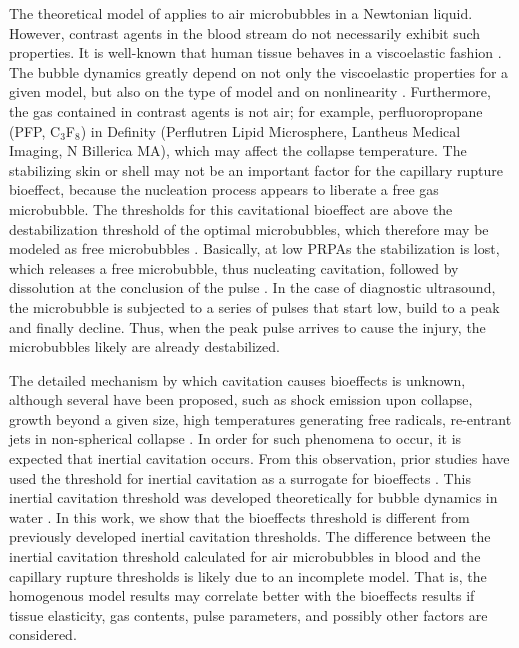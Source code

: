 The theoretical model of \cite{apfel1991} applies to air microbubbles
in a Newtonian liquid. However, contrast agents in the blood stream do
not necessarily exhibit such properties. It is well-known that human
tissue behaves in a viscoelastic fashion
\cite[]{frizzell1976,madsen1983}. The bubble dynamics greatly depend
on not only the viscoelastic properties \cite[]{allen2000a,Yang2005}
for a given model, but also on the type of model \cite[]{johnsen2012} and
on nonlinearity \cite[]{allen2000b}.  Furthermore, the gas contained
in contrast agents is not air; for example, perfluoropropane (PFP, C$_3$F$_8$) in
Definity (Perflutren Lipid Microsphere, Lantheus Medical Imaging, N
Billerica MA), which may affect the collapse temperature.  The
stabilizing skin or shell may not be an important factor for the
capillary rupture bioeffect, because the nucleation process appears to
liberate a free gas microbubble. The thresholds for this cavitational
bioeffect are above the destabilization threshold of the optimal
microbubbles, which therefore may be modeled as free microbubbles
\cite[]{sboros2002,marmottant2005}.  Basically, at low PRPAs the
stabilization is lost, which releases a free microbubble, thus
nucleating cavitation, followed by dissolution at the conclusion of
the pulse \cite[]{porter2006}.  In the case of diagnostic ultrasound,
the microbubble is subjected to
a series of pulses that start low, build to a peak and finally
decline.   Thus, when the peak pulse arrives to cause the injury, the 
microbubbles likely are already destabilized.

The detailed mechanism by which cavitation causes bioeffects is
unknown, although several have been proposed, such as shock emission
upon collapse, growth beyond a given size, high temperatures
generating free radicals, re-entrant jets in non-spherical collapse
\cite[]{nyborg2002}. In order for such phenomena to occur, it is
expected that inertial cavitation occurs. From this observation, prior
studies have used the threshold for inertial cavitation as a surrogate
for bioeffects \cite[]{Yang2005}. This inertial cavitation threshold
was developed theoretically for bubble dynamics in water
\cite[]{flynn1975}. In this work, we show that the bioeffects
threshold is different from previously developed inertial cavitation
thresholds. The difference between the inertial cavitation threshold
calculated for air microbubbles in blood and the capillary rupture
thresholds is likely due to an incomplete model.  That is, the
homogenous model results may correlate better with the bioeffects
results if tissue elasticity, gas contents, pulse parameters, and
possibly other factors are considered.  

